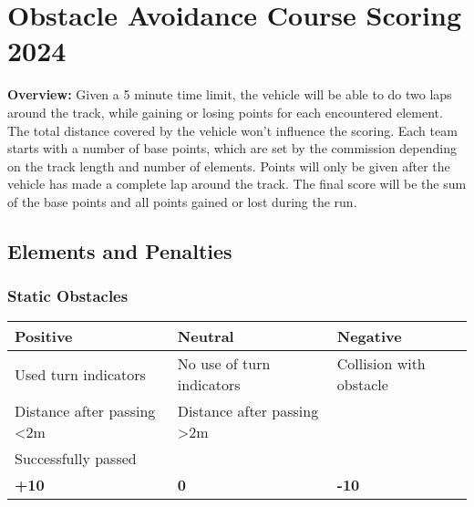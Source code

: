 {
\section*{Obstacle Avoidance Course Scoring 2024}

\renewcommand*\footnoterule{}

\textbf{Overview:} Given a 5 minute time limit, the vehicle will be able to do two laps around the track, while gaining or losing points for each encountered element. The total distance covered by the vehicle won't influence the scoring. Each team starts with a number of base points, which are set by the commission depending on the track length and number of elements. Points will only be given after the vehicle has made a complete lap around the track. The final score will be the sum of the base points and all points gained or lost during the run.

\subsection*{Elements and Penalties}

\subsubsection*{Static Obstacles}
\begin{table}[H]
    \begin{tabularx}{\textwidth}{@{}XXX@{}}
        \toprule
        \textbf{Positive}          & \textbf{Neutral}           & \textbf{Negative}       \\
        \midrule
        Used turn indicators       & No use of turn indicators  & Collision with obstacle \\
        Distance after passing <2m & Distance after passing >2m &                         \\
        Successfully passed        &                            &                         \\
        \textbf{+10}               & \textbf{0}                 & \textbf{-10}            \\
        \bottomrule
    \end{tabularx}
\end{table}

}
